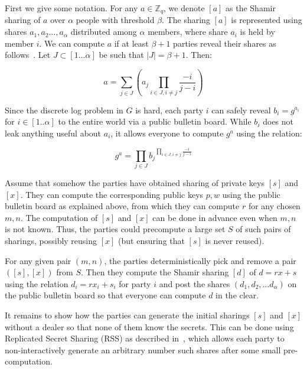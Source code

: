 \documentclass[11pt]{article}
\begin{document}
First we give some notation. For any $a\in \mathbb{Z}_q$, we denote $[a]$ as the Shamir sharing of $a$ over $\alpha$ people with threshold $\beta$. The sharing $[a]$ is represented using shares $a_1, a_2\ldots, a_\alpha$ distributed among $\alpha$ members, where share $a_i$ is held by member $i$. We can compute $a$ if at least $\beta+1$ parties reveal their shares as follows~\cite{shamir1979share}. Let $J\subset [1\ldots\alpha]$ be such that  $|J| = \beta + 1$. Then: 


$$a = \sum_{j\in J}\left(a_j\prod_{i\in J, i\neq j}\frac{-i}{j-i}\right)$$


Since the discrete log problem in $G$ is hard, each party $i$ can safely reveal $b_i = g^{a_i}$ for $i \in [1..\alpha]$ to the entire world via a public bulletin board. While $b_i$ does not leak anything useful about $a_i$, it allows everyone to compute $g^a$ using the relation:

$$g^a = \prod_{j\in J}{b_j}^{\prod_{i\in J, i\neq j}\frac{-i}{j-i}}$$

Assume that somehow the parties have obtained sharing of private keys $[s]$ and $[x]$. They can compute the corresponding public keys $p, w$ using the public bulletin board as explained above, from which they can compute $r$ for any chosen $m, n$. The computation of $[s]$ and $[x]$ can be done in advance even when $m, n$ is not known. Thus, the parties could precompute a large set $S$ of such pairs of sharings, possibly reusing $[x]$ (but ensuring that $[s]$ is never reused).

For any given pair $(m, n)$, the parties deterministically pick and remove a pair $([s], [x])$ from $S$. Then they compute the Shamir sharing $[d]$ of $d = rx+s$ using the relation $d_i = rx_i+s_i$ for party $i$ and post the shares $(d_1, d_2, \ldots d_\alpha)$ on the public bulletin board so that everyone can compute $d$ in the clear. %


It remains to show how the parties can generate the initial sharings $[s]$ and $[x]$ without a dealer so that none of them know the secrets. This can be done using Replicated Secret Sharing (RSS) as described in~\cite[Section 3.2.3]{SSCMD92}, which allows each party to non-interactively generate an arbitrary number such shares after some small pre-computation.
\end{document}
